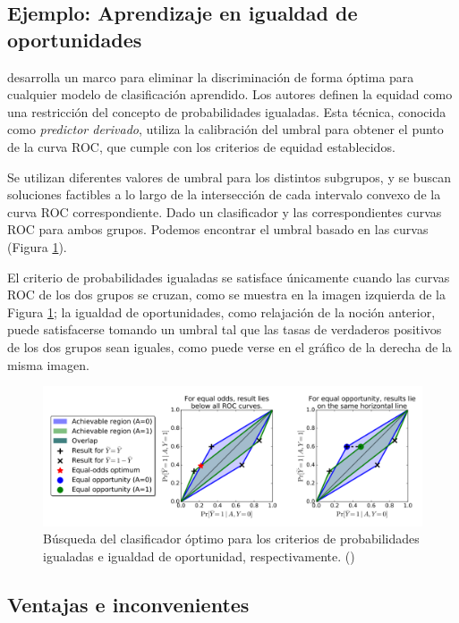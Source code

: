 \documentclass[oneside,openright,titlepage,numbers=noenddot,openany,headinclude,footinclude=true,
cleardoublepage=empty,abstractoff,BCOR=5mm,paper=a4,fontsize=12pt,main=spanish]{scrreprt}
\begin{document}
\subsection{Ejemplo: Aprendizaje en igualdad de oportunidades}

\cite{eodd2016} desarrolla un marco para eliminar la discriminación de forma óptima para cualquier modelo de clasificación aprendido. Los autores definen la equidad como una restricción del concepto de probabilidades igualadas. Esta técnica, conocida como \textit{predictor derivado}, utiliza la calibración del umbral para obtener el punto de la curva ROC, que cumple con los criterios de equidad establecidos. 

Se utilizan diferentes valores de umbral para los distintos subgrupos, y se buscan soluciones factibles a lo largo de la intersección de cada intervalo convexo de la curva ROC correspondiente. Dado un clasificador y las correspondientes curvas ROC para ambos grupos. Podemos encontrar el umbral basado en las curvas (Figura \ref{fig:posprocessing}).

El criterio de probabilidades igualadas se satisface únicamente cuando las curvas ROC de los dos grupos se cruzan, como se muestra en la imagen izquierda de la Figura \ref{fig:posprocessing}; la igualdad de oportunidades, como relajación de la noción anterior, puede satisfacerse tomando un umbral tal que las tasas de verdaderos positivos de los dos grupos sean iguales, como puede verse en el gráfico de la derecha de la misma imagen.

\clearpage

\begin{figure}[h]
	\centering
	\includegraphics[width=15.0cm]{posexample.png}
	\caption{Búsqueda del clasificador óptimo para los criterios de probabilidades igualadas e igualdad de oportunidad, respectivamente. (\cite{eodd2016})}
    \label{fig:posprocessing}
\end{figure}

\subsection*{Ventajas e inconvenientes}
\end{document}
